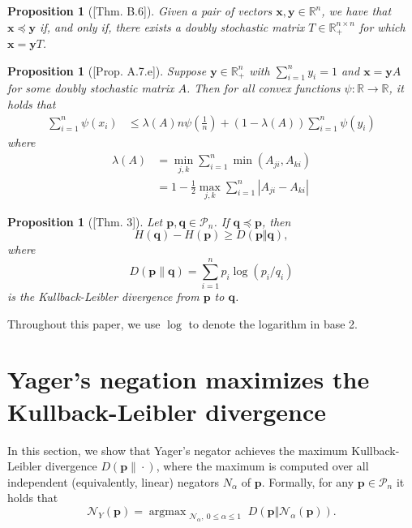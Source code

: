 \documentclass[pdflatex,sn-basic,iicol]{sn-jnl}%
\theoremstyle{thmstyleone}%
\newtheorem{proposition}[theorem]{Proposition}%
\theoremstyle{thmstyletwo}%
\theoremstyle{thmstylethree}%
\DeclareMathOperator*{\argmax}{\arg\max}
\newcommand{\N}{\mathcal{N}}
\newcommand{\cP}{\mathcal{P}}
\newcommand{\bp}{\mathbf{p}}
\newcommand{\bq}{\mathbf{q}}
\newcommand{\x}{\mathbf{x}}
\newcommand{\y}{\mathbf{y}}
\begin{document}
\begin{proposition}[{\cite{marshall1979inequalities}[Thm. B.6]}]\label{prop:equivalence_maj}
    Given a pair of vectors $\x,\y\in \mathbb{R}^n$, we have that $\x\preceq\y$ if, and only if, there exists a doubly stochastic matrix $T\in\mathbb{R}_+^{n\times n}$ for which $\x=\y T$.
\end{proposition}

\begin{proposition}[{\cite{marshall1979inequalities}[Prop. A.7.e]}]
\label{Proposition.1}
   Suppose $\y\in \mathbb{R}_{+}^n$ with $\sum_{i=1}^n y_i = 1$ and $\x=\y A$ for some doubly stochastic matrix $A$. Then for all convex functions $\psi:\mathbb{R} \to \mathbb{R}$, it holds that
   \begin{align*}
       \sum_{i=1}^n \psi(x_i) &\leq \lambda(A)n\psi\left(\frac{1}{n}\right) + (1-\lambda(A))\sum_{i=1}^n \psi(y_i)
   \end{align*}
   where
   \begin{equation*}
       \begin{aligned}
           \lambda(A) &= \min_{j,k} \sum_{i=1}^n \min({A}_{ji}, {A}_{ki})\\
           &= 1 - \frac{1}{2}\max_{j, k}\sum_{i=1}^n |{A}_{ji}-{A}_{ki}|
       \end{aligned}
   \end{equation*}
\end{proposition}

\begin{proposition}[{\cite{ho2010interplay}[Thm. 3]}]\label{prop:divergence}
Let $\bp,\bq\in \cP_n$. If $\bq \preceq \bp$, then
\begin{equation}
    H(\bq) - H(\bp) \geq D(\bp \Vert \bq),
\end{equation}
where 
\begin{equation}\label{divdef}
D(\bp \| \bq) = \sum_{i=1}^n p_i \log (p_i/q_i)
\end{equation}
is the Kullback-Leibler divergence from $\bp$ to $\bq$.
\end{proposition}
Throughout this paper, we use $\log$ to denote the logarithm in base 2.

\section{ Yager's negation maximizes the  Kullback-Leibler divergence}\label{sec:KL_div}

In this section, we show that Yager's negator achieves the maximum Kullback-Leibler divergence $D(\bp\|\cdot)$,
where the maximum is computed over all independent 
(equivalently,
linear) negators $N_\alpha$ of $\bp$.
Formally, for any $\bp\in \cP_n$ it holds that
\begin{equation}    
    \label{eq:max_relative_entropy}
    \N_Y(\bp) = \argmax_{\substack{\N_\alpha, \ 0\leq \alpha\leq 1}} D(\bp\Vert \N_\alpha(\bp)).
\end{equation}
\end{document}
